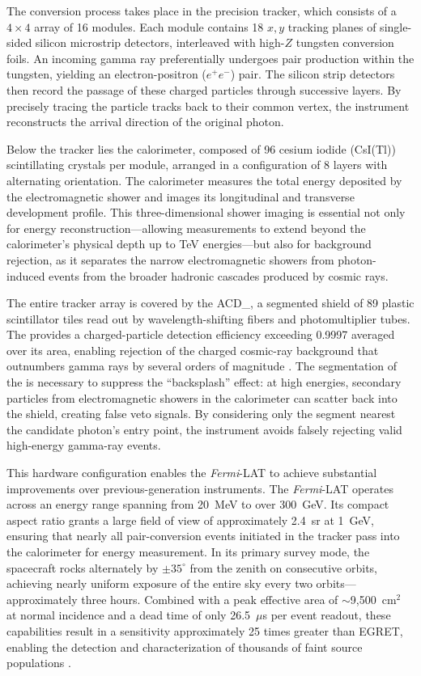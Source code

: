 The conversion process takes place in the precision tracker, which consists of a $4 \times 4$ array of 16 modules.
Each module contains 18 $x,y$ tracking planes of single-sided silicon microstrip detectors, interleaved with high-$Z$ tungsten conversion foils.
An incoming gamma ray preferentially undergoes pair production within the tungsten, yielding an electron-positron ($e^+e^-$) pair.
The silicon strip detectors then record the passage of these charged particles through successive layers.
By precisely tracing the particle tracks back to their common vertex, the instrument reconstructs the arrival direction of the original photon.

Below the tracker lies the calorimeter, composed of 96 cesium iodide (CsI(Tl)) scintillating crystals per module, arranged in a configuration of 8 layers with alternating orientation.
The calorimeter measures the total energy deposited by the electromagnetic shower and images its longitudinal and transverse development profile.
This three-dimensional shower imaging is essential not only for energy reconstruction---allowing measurements to extend beyond the calorimeter's physical depth up to TeV energies---but also for background rejection, as it separates the narrow electromagnetic showers from photon-induced events from the broader hadronic cascades produced by cosmic rays.

The entire tracker array is covered by the \gls{ACD_}, a segmented shield of 89 plastic scintillator tiles read out by wavelength-shifting fibers and photomultiplier tubes.
The \ACD provides a charged-particle detection efficiency exceeding 0.9997 averaged over its area, enabling rejection of the charged cosmic-ray background that outnumbers gamma rays by several orders of magnitude \cite{Atwood:2009ez}.
The segmentation of the \ACD is necessary to suppress the ``backsplash'' effect: at high energies, secondary particles from electromagnetic showers in the calorimeter can scatter back into the shield, creating false veto signals.
By considering only the \ACD segment nearest the candidate photon's entry point, the instrument avoids falsely rejecting valid high-energy gamma-ray events.

This hardware configuration enables the \textit{Fermi}-LAT to achieve substantial improvements over previous-generation instruments.
The \textit{Fermi}-LAT operates across an energy range spanning from 20~MeV to over 300~GeV.
Its compact aspect ratio grants a large field of view of approximately 2.4~sr at 1~GeV, ensuring that nearly all pair-conversion events initiated in the tracker pass into the calorimeter for energy measurement.
In its primary survey mode, the spacecraft rocks alternately by $\pm 35^\circ$ from the zenith on consecutive orbits, achieving nearly uniform exposure of the entire sky every two orbits---approximately three hours.
Combined with a peak effective area of $\sim$9,500~cm$^2$ at normal incidence and a dead time of only 26.5~$\mu$s per event readout, these capabilities result in a sensitivity approximately 25 times greater than EGRET, enabling the detection and characterization of thousands of faint source populations \cite{Atwood:2009ez}.

